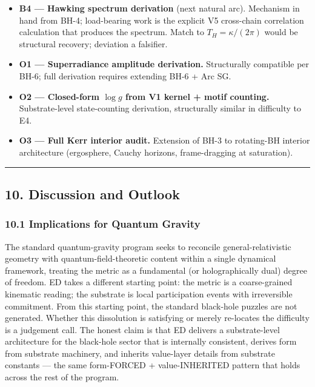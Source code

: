 \documentclass[
  11pt,
  a4paper,
]{article}
\providecommand{\tightlist}{%
  \setlength{\itemsep}{0pt}\setlength{\parskip}{0pt}}
\begin{document}
\begin{itemize}
\tightlist
\item
  \textbf{B4 --- Hawking spectrum derivation} (next natural arc).
  Mechanism in hand from BH-4; load-bearing work is the explicit V5
  cross-chain correlation calculation that produces the spectrum. Match
  to \(T_H = \kappa/(2\pi)\) would be structural recovery; deviation a
  falsifier.
\item
  \textbf{O1 --- Superradiance amplitude derivation.} Structurally
  compatible per BH-6; full derivation requires extending BH-6 + Arc SG.
\item
  \textbf{O2 --- Closed-form \(\log g\) from V1 kernel + motif
  counting.} Substrate-level state-counting derivation, structurally
  similar in difficulty to E4.
\item
  \textbf{O3 --- Full Kerr interior audit.} Extension of BH-3 to
  rotating-BH interior architecture (ergosphere, Cauchy horizons,
  frame-dragging at saturation).
\end{itemize}

\begin{center}\rule{0.5\linewidth}{0.5pt}\end{center}

\subsection{10. Discussion and Outlook}\label{discussion-and-outlook}

\subsubsection{10.1 Implications for Quantum
Gravity}\label{implications-for-quantum-gravity}

The standard quantum-gravity program seeks to reconcile
general-relativistic geometry with quantum-field-theoretic content
within a single dynamical framework, treating the metric as a
fundamental (or holographically dual) degree of freedom. ED takes a
different starting point: the metric is a coarse-grained kinematic
reading; the substrate is local participation events with irreversible
commitment. From this starting point, the standard black-hole puzzles
are not generated. Whether this dissolution is satisfying or merely
re-locates the difficulty is a judgement call. The honest claim is that
ED delivers a substrate-level architecture for the black-hole sector
that is internally consistent, derives form from substrate machinery,
and inherits value-layer details from substrate constants --- the same
form-FORCED + value-INHERITED pattern that holds across the rest of the
program.
\end{document}
